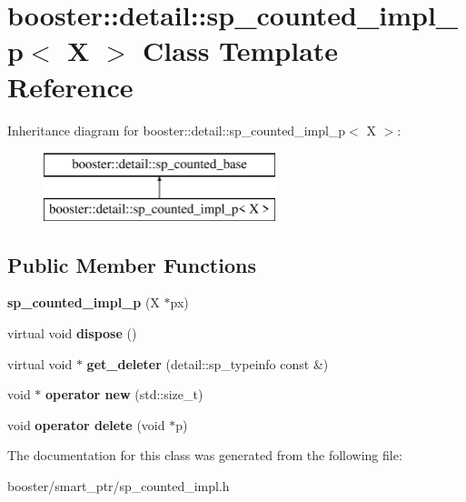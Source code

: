 \section{booster\+:\+:detail\+:\+:sp\+\_\+counted\+\_\+impl\+\_\+p$<$ X $>$ Class Template Reference}
\label{classbooster_1_1detail_1_1sp__counted__impl__p}
Inheritance diagram for booster\+:\+:detail\+:\+:sp\+\_\+counted\+\_\+impl\+\_\+p$<$ X $>$\+:\begin{figure}[H]
\begin{center}
\leavevmode
\includegraphics[height=2.000000cm]{classbooster_1_1detail_1_1sp__counted__impl__p}
\end{center}
\end{figure}
\subsection*{Public Member Functions}
\begin{DoxyCompactItemize}
\item 
{\bfseries sp\+\_\+counted\+\_\+impl\+\_\+p} (X $\ast$px)\label{classbooster_1_1detail_1_1sp__counted__impl__p_a99b31848393c18b1fb789e4c06f92f83}

\item 
virtual void {\bfseries dispose} ()\label{classbooster_1_1detail_1_1sp__counted__impl__p_a7ef73e7619b003920e0e9b550f22df1d}

\item 
virtual void $\ast$ {\bfseries get\+\_\+deleter} (detail\+::sp\+\_\+typeinfo const \&)\label{classbooster_1_1detail_1_1sp__counted__impl__p_a6085f84628eb386305c8c4fd9cfb4701}

\item 
void $\ast$ {\bfseries operator new} (std\+::size\+\_\+t)\label{classbooster_1_1detail_1_1sp__counted__impl__p_af4e588d7cd60223036e738dbc819efeb}

\item 
void {\bfseries operator delete} (void $\ast$p)\label{classbooster_1_1detail_1_1sp__counted__impl__p_a011c5b981adb2dc4b31886c9701381b9}

\end{DoxyCompactItemize}


The documentation for this class was generated from the following file\+:\begin{DoxyCompactItemize}
\item 
booster/smart\+\_\+ptr/sp\+\_\+counted\+\_\+impl.\+h\end{DoxyCompactItemize}
